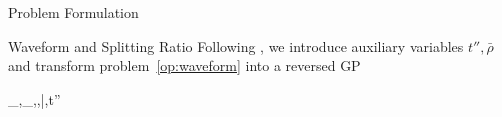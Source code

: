 \documentclass[journal]{IEEEtran}
\begin{document}
\begin{section}{Problem Formulation}
\begin{subsection}{Waveform and Splitting Ratio}
			Following \cite{Clerckx2018b}, we introduce auxiliary variables $t'',\bar{\rho}$ and transform problem~\eqref{op:waveform} into a reversed GP
			\begin{mini!}
				{_{},_,\rho,\bar{\rho},t''}{}{\label{op:waveform_rgp}}{}
				\label{co:waveform_objective}
				\label{co:waveform_rate}
				\label{co:waveform_power}
			\end{mini!}


\end{subsection}
\end{section}
\end{document}
